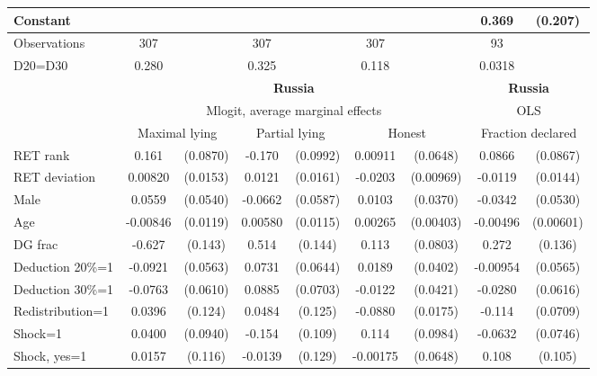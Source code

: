 \begin{tabular}{l|cccccc|cc}
Constant        &                  &         &                  &         &                  &         &    0.369\sym{*}  &  (0.207)\\
\hline
Observations    &      307         &         &      307         &         &      307         &         &       93         &         \\
D20=D30         &    0.280         &         &    0.325         &         &    0.118         &         &   0.0318         &         \\
\hline\hline
&\multicolumn{6}{c|}{\bf Russia}&\multicolumn{2}{c}{\bf Russia}\\ &\multicolumn{6}{c|}{Mlogit, average marginal effects }&\multicolumn{2}{c}{OLS}\\
                &\multicolumn{2}{c}{Maximal lying}&\multicolumn{2}{c}{Partial lying}&\multicolumn{2}{c}{Honest}  &\multicolumn{2}{c}{Fraction declared}\\
\hline
RET rank        &    0.161\sym{*}  & (0.0870)&   -0.170\sym{*}  & (0.0992)&  0.00911         & (0.0648)&   0.0866         & (0.0867)\\
RET deviation   &  0.00820         & (0.0153)&   0.0121         & (0.0161)&  -0.0203\sym{**} &(0.00969)&  -0.0119         & (0.0144)\\
Male            &   0.0559         & (0.0540)&  -0.0662         & (0.0587)&   0.0103         & (0.0370)&  -0.0342         & (0.0530)\\
Age             & -0.00846         & (0.0119)&  0.00580         & (0.0115)&  0.00265         &(0.00403)& -0.00496         &(0.00601)\\
DG frac         &   -0.627\sym{***}&  (0.143)&    0.514\sym{***}&  (0.144)&    0.113         & (0.0803)&    0.272\sym{**} &  (0.136)\\
Deduction 20\%=1&  -0.0921         & (0.0563)&   0.0731         & (0.0644)&   0.0189         & (0.0402)& -0.00954         & (0.0565)\\
Deduction 30\%=1&  -0.0763         & (0.0610)&   0.0885         & (0.0703)&  -0.0122         & (0.0421)&  -0.0280         & (0.0616)\\
Redistribution=1&   0.0396         &  (0.124)&   0.0484         &  (0.125)&  -0.0880\sym{***}& (0.0175)&   -0.114         & (0.0709)\\
Shock=1         &   0.0400         & (0.0940)&   -0.154         &  (0.109)&    0.114         & (0.0984)&  -0.0632         & (0.0746)\\
Shock, yes=1    &   0.0157         &  (0.116)&  -0.0139         &  (0.129)& -0.00175         & (0.0648)&    0.108         &  (0.105)\\

\end{tabular}
